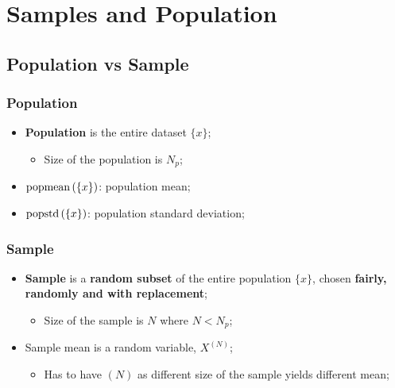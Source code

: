 \chapter{Samples and Population}

\section{Population vs Sample}

  \subsection{Population}
  
    \begin{itemize}
      \item \textbf{Population} is the entire dataset $ \{ x \} $;
      \begin{itemize}
        \item Size of the population is $ N_{p} $;
      \end{itemize}
      
      \item $ \operatorname{popmean}\left( \{ x \} \right) $: population mean;
      \item $ \operatorname{popstd}\left( \{ x \} \right) $: population standard deviation;
    \end{itemize}
  
  \subsection{Sample}

    \begin{itemize}
      \item \textbf{Sample} is a \textbf{random subset} of the entire population $ \{ x \} $, chosen \textbf{fairly, randomly and with replacement};
      \begin{itemize}
        \item Size of the sample is $ N $ where $ N < N_{p} $;
      \end{itemize}
      
      \item Sample mean is a random variable, $ X^{\left( N \right)} $;
      \begin{itemize}
        \item Has to have $ \left( N \right) $ as different size of the sample yields different mean;
      \end{itemize}
    \end{itemize}
  
